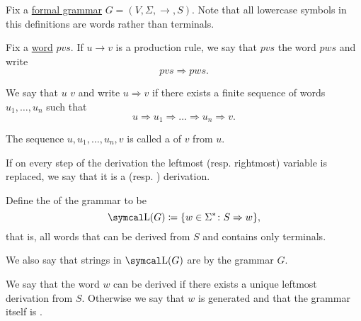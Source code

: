 \begin{definition}\label{def:grammar_derivation}
  Fix a \hyperref[def:grammar]{formal grammar} \( G = (V, \Sigma, \to, S) \). Note that all lowercase symbols in this definitions are words rather than terminals.

  \begin{DefEnum}
     Fix a \hyperref[def:language/word]{word} \( pvs \). If \( u \to v \) is a production rule, we say that \( pvs \)  the word \( pws \) and write
    \begin{equation*}
      pvs \Rightarrow pws.
    \end{equation*}

     We say that \( u \)  \( v \) and write \( u \Rightarrow v \) if there exists a finite sequence of words \( u_1, \ldots, u_n \) such that
    \begin{equation*}
      u \Rightarrow u_1 \Rightarrow \ldots \Rightarrow u_n \Rightarrow v.
    \end{equation*}

    The sequence \( u, u_1, \ldots, u_n, v \) is called a  of \( v \) from \( u \).

     If on every step of the derivation the leftmost (resp. rightmost) variable is replaced, we say that it is a  (resp. ) derivation.

     Define the  of the grammar to be
    \begin{equation*}
      \CL(G) \coloneqq \{ w \in \Sigma^* \colon S \Rightarrow w \},
    \end{equation*}
    that is, all words that can be derived from \( S \) and contains only terminals.

    We also say that strings in \( \CL(G) \) are  by the grammar \( G \).

    We say that the word \( w \) can be derived  if there exists a unique leftmost derivation from \( S \). Otherwise we say that \( w \) is generated  and that the grammar itself is .
  \end{DefEnum}
\end{definition}

